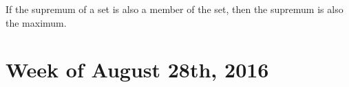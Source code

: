 \documentclass{article}
\begin{document}
\begin{defn}[Maximum]If the supremum of a set is also a member of the set, then the supremum is also the maximum.
\end{defn}



\section{Week of August 28th, 2016}
\end{document}
